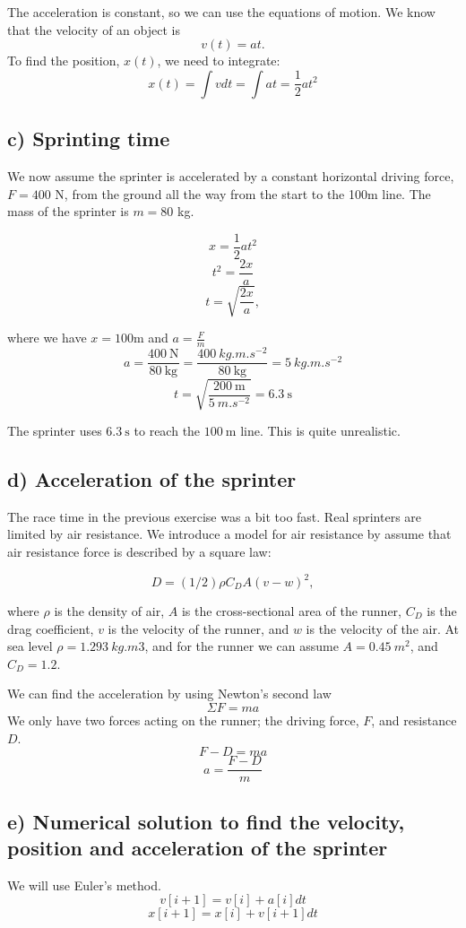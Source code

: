 \documentclass[a4paper,10pt,english]{article}
\begin{document}
The acceleration is constant, so we can use the equations of motion.
We know that the velocity of an object is 
\[v(t)=at.\]
To find the position, $x(t)$, we need to integrate:
\[x(t)=\int{vdt}=\int{at}=\frac{1}{2}at^2\]


\subsection*{c) Sprinting time}

We now assume the sprinter is accelerated by a constant horizontal driving force, $F=400$ N, from the ground all the way from the start to the 100m line. The mass of the sprinter is $m=80$ kg.

\[x=\frac{1}{2}at^2\]
\[t^2=\frac{2x}{a}\]
\[t=\sqrt{\frac{2x}{a}},\]

where we have $x=100$m and $a=\frac{F}{m}$
\[a=\frac{\SI{400}{\newton}}{\SI{80}{\kilogram}}=\frac{\SI{400}{kg.m.s^{-2}}}{\SI{80}{\kilogram}}=\SI{5}{kg.m.s^{-2}}\]
\[t=\sqrt{\frac{\SI{200}{\meter}}{\SI{5}{m.s^{-2}}}}=\SI{6.3}{\second}\]

The sprinter uses $\SI{6.3}{\second}$ to reach the $\SI{100}{\meter}$ line. This is quite unrealistic.

\subsection*{d) Acceleration of the sprinter}

The race time in the previous exercise was a bit too fast. Real sprinters are limited by air resistance. We introduce a model for air resistance by assume that air resistance force is described by a square law:

\[D=(1/2)\rho C_D A(v-w)^2,\]

where $\rho$ is the density of air, $A$ is the cross-sectional area of the runner, $C_D$ is the drag coefficient, $v$ is the velocity of the runner, and $w$ is the velocity of the air. At sea level $\rho=\SI{1.293}{kg.m{3}}$, and for the runner we can assume $A=\SI{0.45}{m{^2}}$, and $C_D=1.2$.

We can find the acceleration by using Newton's second law
\[\Sigma F=ma\]
We only have two forces acting on the runner; the driving force, $F$, and resistance $D$.
\[F-D=ma\]
\[a=\frac{F-D}{m}\]

\subsection*{e) Numerical solution to find the velocity, position and acceleration of the sprinter}
We will use Euler's method. 
\[v[i+1]=v[i] + a[i]dt\]
\[x[i+1]=x[i]+v[i+1]dt\]
\end{document}
